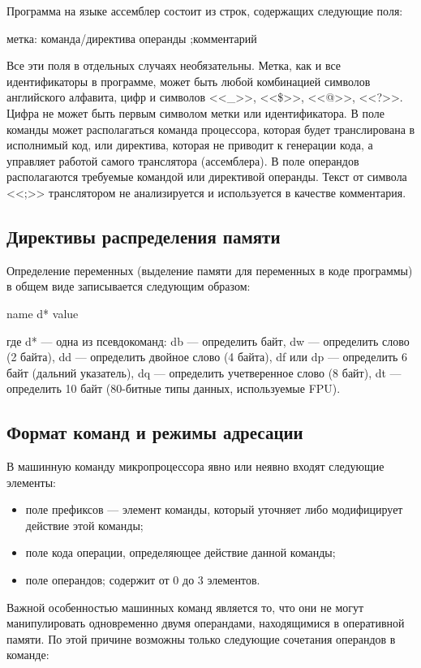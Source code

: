 Программа на языке ассемблер состоит из строк, содержащих следующие поля:

метка: команда/директива операнды ;комментарий

Все эти поля в отдельных случаях необязательны. Метка, как и все идентификаторы в
программе, может быть любой комбинацией символов английского алфавита, цифр и символов
<<\_>>, <<\$>>, <<@>>, <<?>>. Цифра не может быть первым символом метки или идентификатора. 
В поле команды может располагаться команда процессора, которая будет транслирована в 
исполнимый код, или директива, которая не приводит к генерации кода, а управляет работой
самого транслятора (ассемблера). В поле операндов располагаются требуемые командой или
директивой операнды. Текст от символа <<;>> транслятором не анализируется и используется
в качестве комментария.

\subsection{Директивы распределения памяти}

Определение переменных (выделение памяти для переменных в коде программы) в общем
виде записывается следующим образом:

name d* value

где d* --- одна из псевдокоманд: db --- определить байт, dw --- определить слово (2 байта), dd ---
определить двойное слово (4 байта), df или dp --- определить 6 байт (дальний указатель), dq ---
определить учетверенное слово (8 байт), dt --- определить 10 байт (80-битные типы данных,
используемые FPU).

\subsection{Формат команд и режимы адресации}

В машинную команду микропроцессора явно или неявно входят следующие элементы:

\begin{itemize}
\item поле префиксов --- элемент команды, который уточняет либо модифицирует действие этой
  команды;
\item поле кода операции, определяющее действие данной команды;
\item поле операндов; содержит от 0 до 3 элементов.
\end{itemize}

Важной особенностью машинных команд является то, что они не могут манипулировать
одновременно двумя операндами, находящимися в оперативной памяти. По этой причине
возможны только следующие сочетания операндов в команде:

